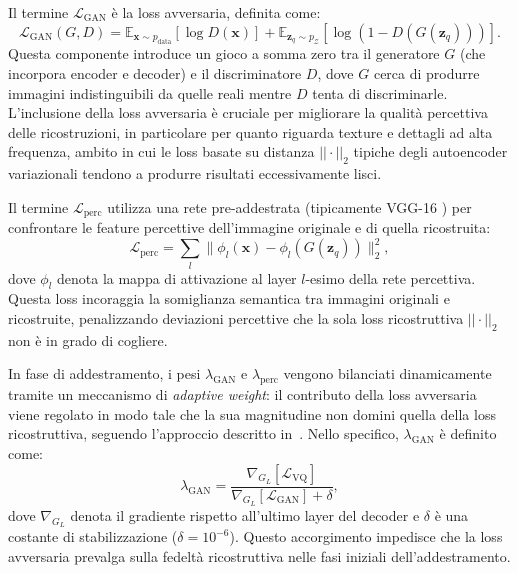 Il termine $\mathcal{L}_{\text{GAN}}$ è la loss avversaria, definita come:
\begin{equation}
\mathcal{L}_{\text{GAN}}(G, D) = \mathbb{E}_{\mathbf{x} \sim p_{\text{data}}}[\log D(\mathbf{x})] + \mathbb{E}_{\mathbf{z}_q \sim p_{\mathcal{Z}}}[\log(1 - D(G(\mathbf{z}_q)))].
\end{equation}
Questa componente introduce un gioco a somma zero tra il generatore $G$ (che incorpora encoder e decoder) e il discriminatore $D$, dove $G$ cerca di produrre immagini indistinguibili da quelle reali mentre $D$ tenta di discriminarle. L'inclusione della loss avversaria è cruciale per migliorare la qualità percettiva delle ricostruzioni, in particolare per quanto riguarda texture e dettagli ad alta frequenza, ambito in cui le loss basate su distanza $||\cdot||_2$ tipiche degli autoencoder variazionali tendono a produrre risultati eccessivamente lisci.

Il termine $\mathcal{L}_{\text{perc}}$ utilizza una rete pre-addestrata (tipicamente VGG-16 \cite{simonyan-2015}) per confrontare le feature percettive dell'immagine originale e di quella ricostruita:
\begin{equation}
\mathcal{L}_{\text{perc}} = \sum_{l} \|\phi_l(\mathbf{x}) - \phi_l(G(\mathbf{z}_q))\|_2^2,
\end{equation}
dove $\phi_l$ denota la mappa di attivazione al layer $l$-esimo della rete percettiva. Questa loss incoraggia la somiglianza semantica tra immagini originali e ricostruite, penalizzando deviazioni percettive che la sola loss ricostruttiva $||\cdot||_2$ non è in grado di cogliere.

In fase di addestramento, i pesi $\lambda_{\text{GAN}}$ e $\lambda_{\text{perc}}$ vengono bilanciati dinamicamente tramite un meccanismo di \emph{adaptive weight}: il contributo della loss avversaria viene regolato in modo tale che la sua magnitudine non domini quella della loss ricostruttiva, seguendo l'approccio descritto in~\cite{esser-2020}. Nello specifico, $\lambda_{\text{GAN}}$ è definito come:
\begin{equation}
\lambda_{\text{GAN}} = \frac{\nabla_{G_L}[\mathcal{L}_{\text{VQ}}]}{\nabla_{G_L}[\mathcal{L}_{\text{GAN}}] + \delta},
\end{equation}
dove $\nabla_{G_L}$ denota il gradiente rispetto all'ultimo layer del decoder e $\delta$ è una costante di stabilizzazione ($\delta = 10^{-6}$). Questo accorgimento impedisce che la loss avversaria prevalga sulla fedeltà ricostruttiva nelle fasi iniziali dell'addestramento.

